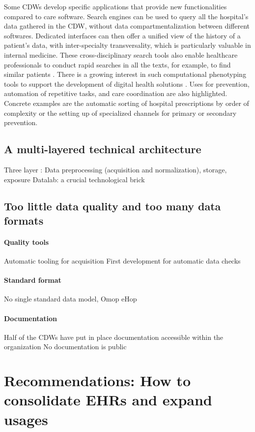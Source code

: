 \documentclass{report}
\begin{document}
Some CDWs develop specific applications that provide new functionalities
compared to care software. Search engines can be used to query all the
hospital's data gathered in the CDW, without data compartmentalization between
different softwares. Dedicated interfaces can then offer a unified view of the
history of a patient's data, with inter-specialty transversality, which is
particularly valuable in internal medicine. These cross-disciplinary search
tools also enable healthcare professionals to conduct rapid searches in all the
texts, for example, to find similar patients \citep{garcelon2017finding}.
%
There is a growing interest in such computational phenotyping tools to support
the development of digital health solutions \citep{wen2023impact}.
%
Uses for prevention, automation of repetitive tasks, and care coordination are
also highlighted. Concrete examples are the automatic sorting of hospital
prescriptions by order of complexity or the setting up of specialized channels
for primary or secondary prevention.

\subsection{A multi-layered technical
  architecture}\label{subsec:cdw:results:architecture} Three layer : Data
preprocessing (acquisition and normalization), storage, exposure Datalab: a
crucial technological brick

\subsection{Too little data quality and too many data
  formats}\label{subsec:cdw:results:data_quality}
\paragraph{Quality tools}
Automatic tooling for acquisition
First development for automatic data checks
\paragraph{Standard format}
No single standard data model,
Omop
eHop
\paragraph{Documentation}
Half of the CDWs have put in place documentation accessible within the organization
No documentation is public

\section{Recommendations: How to consolidate EHRs and expand
  usages}\label{sec:cdw:recommendations}
\end{document}
